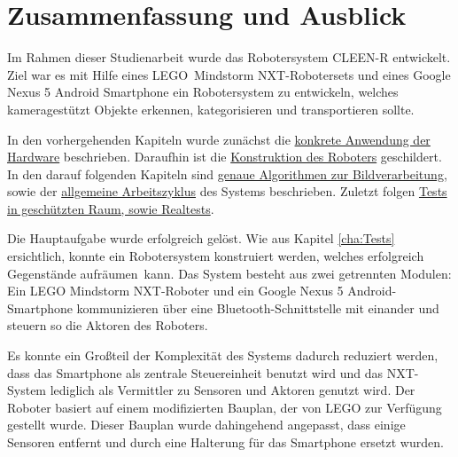 \chapter{Zusammenfassung und Ausblick}
\label{cha:Fazit}

Im Rahmen dieser Studienarbeit wurde das Robotersystem CLEEN-R entwickelt. Ziel war es mit Hilfe eines LEGO\textregistered\ Mindstorm NXT-Robotersets und eines Google Nexus 5 Android Smartphone ein Robotersystem zu entwickeln, welches kameragestützt Objekte erkennen, kategorisieren und transportieren sollte. 

In den vorhergehenden Kapiteln wurde zunächst die \hyperref[cha:Materials]{konkrete Anwendung der Hardware}  beschrieben. Daraufhin ist die \hyperref[cha:robot]{Konstruktion des Roboters} geschildert. In den darauf folgenden Kapiteln sind \hyperref[cha:Software]{genaue Algorithmen zur Bildverarbeitung}, sowie der \hyperref[cha:Workloop]{allgemeine Arbeitszyklus} des Systems beschrieben. Zuletzt folgen \hyperref[cha:Tests]{Tests in geschützten Raum, sowie Realtests}.

Die Hauptaufgabe wurde erfolgreich gelöst. Wie aus Kapitel \ref{cha:Tests} ersichtlich, konnte ein Robotersystem konstruiert werden, welches erfolgreich Gegenstände \glqq aufräumen\grqq\ kann. Das System besteht aus zwei getrennten Modulen: Ein LEGO Mindstorm NXT-Roboter und ein Google Nexus 5 Android-Smartphone kommunizieren über eine Bluetooth-Schnittstelle mit einander und steuern so die Aktoren des Roboters. 

Es konnte ein Großteil der Komplexität des Systems dadurch reduziert werden, dass das Smartphone als zentrale Steuereinheit benutzt wird und das NXT-System lediglich als Vermittler zu Sensoren und Aktoren genutzt wird. Der Roboter basiert auf einem modifizierten Bauplan, der von LEGO zur Verfügung gestellt wurde. Dieser Bauplan wurde dahingehend angepasst, dass einige Sensoren entfernt und durch eine Halterung für das Smartphone ersetzt wurden.